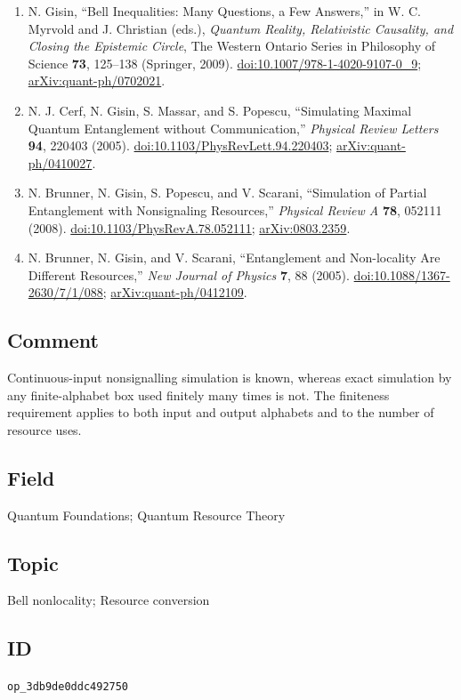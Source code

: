 \begin{enumerate}[label={},leftmargin=4.8em,labelsep=0.5em]
  \footnotesize
  \item[\textup{[Gis09]}]\label{ref:p29-gisin}
  N. Gisin, ``Bell Inequalities: Many Questions, a Few Answers,'' in
  W. C. Myrvold and J. Christian (eds.), \emph{Quantum Reality, Relativistic
  Causality, and Closing the Epistemic Circle}, The Western Ontario Series in
  Philosophy of Science \textbf{73}, 125--138 (Springer, 2009).
  \href{https://doi.org/10.1007/978-1-4020-9107-0_9}{doi:10.1007/978-1-4020-9107-0\_9};
  \href{https://arxiv.org/abs/quant-ph/0702021}{arXiv:quant-ph/0702021}.

  \item[\textup{[CGMP05]}]\label{ref:p29-cerf}
  N. J. Cerf, N. Gisin, S. Massar, and S. Popescu, ``Simulating Maximal
  Quantum Entanglement without Communication,'' \emph{Physical Review
  Letters} \textbf{94}, 220403 (2005).
  \href{https://doi.org/10.1103/PhysRevLett.94.220403}{doi:10.1103/PhysRevLett.94.220403};
  \href{https://arxiv.org/abs/quant-ph/0410027}{arXiv:quant-ph/0410027}.

  \item[\textup{[BGPS08]}]\label{ref:p29-brunner-pra}
  N. Brunner, N. Gisin, S. Popescu, and V. Scarani, ``Simulation of Partial
  Entanglement with Nonsignaling Resources,'' \emph{Physical Review A}
  \textbf{78}, 052111 (2008).
  \href{https://doi.org/10.1103/PhysRevA.78.052111}{doi:10.1103/PhysRevA.78.052111};
  \href{https://arxiv.org/abs/0803.2359}{arXiv:0803.2359}.

  \item[\textup{[BGS05]}]\label{ref:p29-brunner-njp}
  N. Brunner, N. Gisin, and V. Scarani, ``Entanglement and Non-locality Are
  Different Resources,'' \emph{New Journal of Physics} \textbf{7}, 88
  (2005). \href{https://doi.org/10.1088/1367-2630/7/1/088}{doi:10.1088/1367-2630/7/1/088};
  \href{https://arxiv.org/abs/quant-ph/0412109}{arXiv:quant-ph/0412109}.
\end{enumerate}

\subsection*{Comment}

Continuous-input nonsignalling simulation is known, whereas exact simulation
by any finite-alphabet box used finitely many times is not.  The finiteness
requirement applies to both input and output alphabets and to the number of
resource uses.

\subsection*{Field}

Quantum Foundations; Quantum Resource Theory

\subsection*{Topic}

Bell nonlocality; Resource conversion

\subsection*{ID}

\texttt{op\_3db9de0ddc492750}
